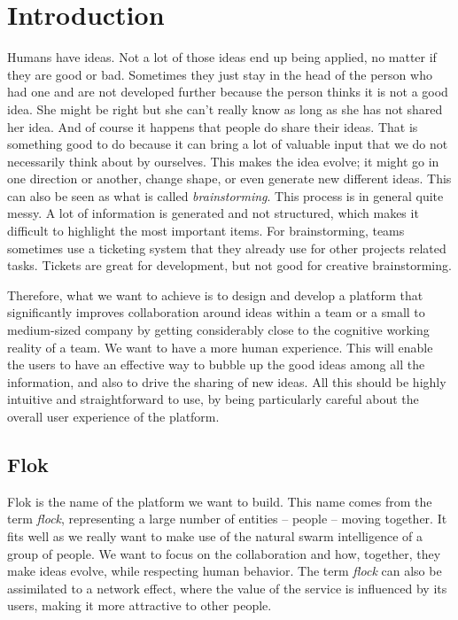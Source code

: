 \documentclass[a4paper,12pt, oneside]{article}
\begin{document}
\tableofcontents
\newpage

\setcounter{page}{1}


\section{Introduction}
Humans have ideas. Not a lot of those ideas end up being applied, no matter if they are good or bad.
Sometimes they just stay in the head of the person who had one and are not developed further because the person thinks it is not a good idea.
She might be right but she can't really know as long as she has not shared her idea.
And of course it happens that people do share their ideas.
That is something good to do because it can bring a lot of valuable input that we do not necessarily think about by ourselves.
This makes the idea evolve; it might go in one direction or another, change shape, or even generate new different ideas.
This can also be seen as what is called \emph{brainstorming}. This process is in general quite messy.
A lot of information is generated and not structured, which makes it difficult to highlight the most important items.
For brainstorming, teams sometimes use a ticketing system that they already use for other projects related tasks.
Tickets are great for development, but not good for creative brainstorming.

Therefore, what we want to achieve is to design and develop a platform that significantly improves collaboration around ideas within a team or a small to medium-sized company by getting considerably close to the cognitive working reality of a team.
We want to have a more human experience.
This will enable the users to have an effective way to bubble up the good ideas among all the information, and also to drive the sharing of new ideas.
All this should be highly intuitive and straightforward to use, by being particularly careful about the overall user experience of the platform.

\subsection{Flok}
Flok is the name of the platform we want to build.
This name comes from the term \emph{flock}, representing a large number of entities – people – moving together.
It fits well as we really want to make use of the natural swarm intelligence of a group of people.
We want to focus on the collaboration and how, together, they make ideas evolve, while respecting human behavior.
The term \emph{flock} can also be assimilated to a network effect, where the value of the service is influenced by its users, making it more attractive to other people.
\end{document}
